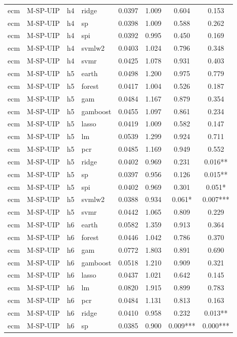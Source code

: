 \begin{ThreePartTable}
\begin{longtable}[t]{llclcccc}
ecm & M-SP-UIP & h4 & ridge & 0.0397 & 1.009 & 0.604 & 0.153\\
ecm & M-SP-UIP & h4 & sp & 0.0398 & 1.009 & 0.588 & 0.262\\
ecm & M-SP-UIP & h4 & spi & 0.0392 & 0.995 & 0.450 & 0.169\\
ecm & M-SP-UIP & h4 & svmlw2 & 0.0403 & 1.024 & 0.796 & 0.348\\
ecm & M-SP-UIP & h4 & svmr & 0.0425 & 1.078 & 0.931 & 0.403\\
\addlinespace
ecm & M-SP-UIP & h5 & earth & 0.0498 & 1.200 & 0.975 & 0.779\\
ecm & M-SP-UIP & h5 & forest & 0.0417 & 1.004 & 0.526 & 0.187\\
ecm & M-SP-UIP & h5 & gam & 0.0484 & 1.167 & 0.879 & 0.354\\
ecm & M-SP-UIP & h5 & gamboost & 0.0455 & 1.097 & 0.861 & 0.234\\
ecm & M-SP-UIP & h5 & lasso & 0.0419 & 1.009 & 0.582 & 0.147\\
ecm & M-SP-UIP & h5 & lm & 0.0539 & 1.299 & 0.924 & 0.711\\
ecm & M-SP-UIP & h5 & pcr & 0.0485 & 1.169 & 0.949 & 0.552\\
ecm & M-SP-UIP & h5 & ridge & 0.0402 & 0.969 & 0.231 & 0.016**\\
ecm & M-SP-UIP & h5 & sp & 0.0397 & 0.956 & 0.126 & 0.015**\\
ecm & M-SP-UIP & h5 & spi & 0.0402 & 0.969 & 0.301 & 0.051*\\
ecm & M-SP-UIP & h5 & svmlw2 & 0.0388 & 0.934 & 0.061* & 0.007***\\
ecm & M-SP-UIP & h5 & svmr & 0.0442 & 1.065 & 0.809 & 0.229\\
\addlinespace
ecm & M-SP-UIP & h6 & earth & 0.0582 & 1.359 & 0.913 & 0.364\\
ecm & M-SP-UIP & h6 & forest & 0.0446 & 1.042 & 0.786 & 0.370\\
ecm & M-SP-UIP & h6 & gam & 0.0772 & 1.803 & 0.891 & 0.690\\
ecm & M-SP-UIP & h6 & gamboost & 0.0518 & 1.210 & 0.909 & 0.321\\
ecm & M-SP-UIP & h6 & lasso & 0.0437 & 1.021 & 0.642 & 0.145\\
ecm & M-SP-UIP & h6 & lm & 0.0820 & 1.915 & 0.899 & 0.783\\
ecm & M-SP-UIP & h6 & pcr & 0.0484 & 1.131 & 0.813 & 0.163\\
ecm & M-SP-UIP & h6 & ridge & 0.0410 & 0.958 & 0.232 & 0.013**\\
ecm & M-SP-UIP & h6 & sp & 0.0385 & 0.900 & 0.009*** & 0.000***\\

\end{longtable}
\end{ThreePartTable}
